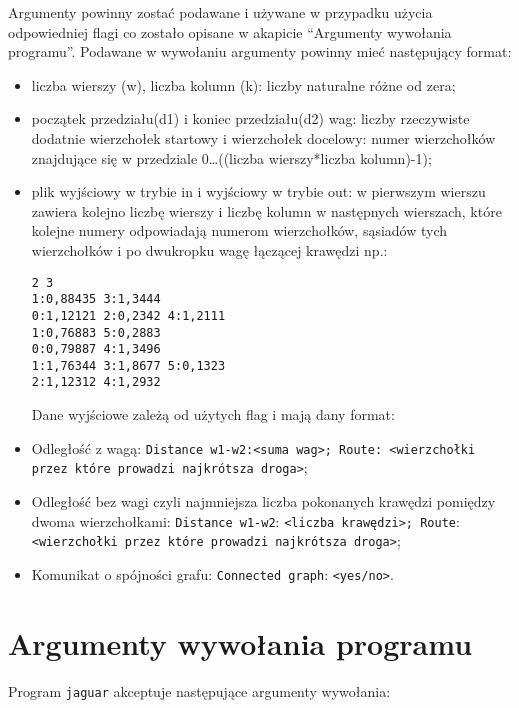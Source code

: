 \documentclass[]{article}
\begin{document}
Argumenty powinny zostać podawane i używane w przypadku użycia odpowiedniej flagi co zostało opisane w akapicie “Argumenty wywołania programu”. Podawane w wywołaniu argumenty powinny mieć następujący format:
\begin{itemize}
\item
liczba wierszy (w), liczba kolumn (k): liczby naturalne różne od zera; 
\item
początek przedziału(d1) i koniec przedziału(d2) wag: liczby rzeczywiste dodatnie 
wierzchołek startowy i wierzchołek docelowy: numer wierzchołków znajdujące się w przedziale                              {0…((liczba wierszy*liczba kolumn)-1)};
\item
plik wyjściowy w trybie in i wyjściowy w trybie out:  w pierwszym wierszu zawiera kolejno liczbę wierszy i liczbę kolumn w następnych wierszach, które kolejne numery odpowiadają numerom wierzchołków, sąsiadów tych wierzchołków i po dwukropku wagę łączącej krawędzi np.:

\texttt{2 3\\
1:0,88435 3:1,3444\\
0:1,12121 2:0,2342 4:1,2111\\
1:0,76883 5:0,2883\\
0:0,79887 4:1,3496\\
1:1,76344 3:1,8677 5:0,1323\\
2:1,12312 4:1,2932}

Dane wyjściowe zależą od użytych flag i mają dany format:
\item
Odległość z wagą: \texttt{Distance w1-w2:<suma wag>; Route: <wierzchołki przez które prowadzi najkrótsza droga>};
\item
Odległość bez wagi czyli najmniejsza liczba pokonanych krawędzi pomiędzy dwoma wierzchołkami: \texttt{Distance w1-w2}: \texttt{<liczba krawędzi>; Route}: \texttt{<wierzchołki przez które prowadzi najkrótsza droga>};
\item
Komunikat o spójności grafu: \texttt{Connected graph}: \texttt{<yes/no>}.

\end{itemize}
\section{Argumenty wywołania programu}\label{header-n256}
Program \texttt{jaguar} akceptuje następujące argumenty wywołania:
\end{document}
